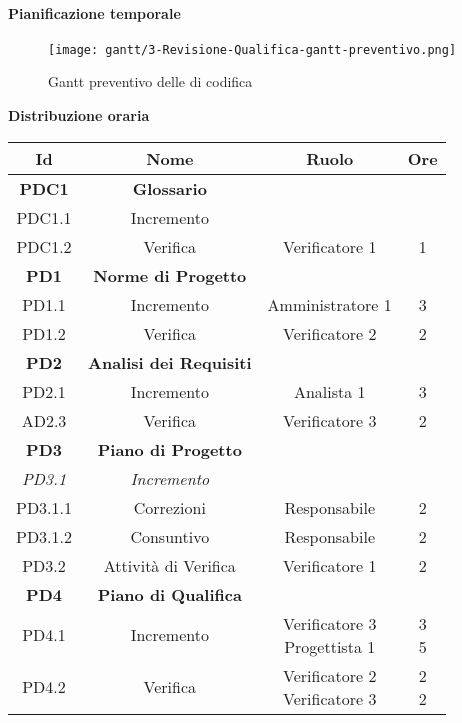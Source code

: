 \documentclass{scalatekids-article}
\begin{document}
\newpage
\paragraph{Pianificazione temporale}
\begin{figure}[H]
  \texttt{[image: gantt/3-Revisione-Qualifica-gantt-preventivo.png]}
  \caption{Gantt preventivo delle  di codifica}
\end{figure}

\newpage
\textbf{Distribuzione oraria}
\scriptsize
\begin{center}
  \begin{tabular}{| c | c | c | c |}
    \hline
    \textbf{Id} & \textbf{Nome} & \textbf{Ruolo} & \textbf{Ore}\\
    \hline
    \textbf{PDC1} & \textbf{Glossario} & &\\
    \hline
    PDC1.1 & Incremento &  &\\
    \hline
    PDC1.2 & Verifica & Verificatore 1 & 1\\
    \hline
    \textbf{PD1} & \textbf{Norme di Progetto} & &\\
    \hline
    PD1.1 & Incremento & Amministratore 1 & 3\\
    \hline
    PD1.2 & Verifica & Verificatore 2 & 2\\
    \hline
    \textbf{PD2} & \textbf{Analisi dei Requisiti} & &\\
    \hline
    PD2.1 & Incremento & Analista 1 & 3\\
    \hline
    AD2.3 & Verifica & Verificatore 3 & 2\\
    \hline
    \textbf{PD3} & \textbf{Piano di Progetto} & &\\
    \hline
    \textit{PD3.1} & \textit{Incremento} & &\\
    \hline
    PD3.1.1 & Correzioni & Responsabile & 2\\
    \hline
    PD3.1.2 & Consuntivo & Responsabile & 2\\
    \hline
    PD3.2 & Attività di Verifica & Verificatore 1 & 2\\
    \hline
    \textbf{PD4} & \textbf{Piano di Qualifica} & &\\
    \hline
    PD4.1 & Incremento & \multiLineCell[t]{Verificatore 3\\Progettista 1} & \multiLineCell[t]{3\\5}\\
    \hline
    PD4.2 & Verifica & \multiLineCell[t]{Verificatore 2\\Verificatore 3} & \multiLineCell[t]{2\\2}\\

\end{tabular}
\end{center}
\end{document}
